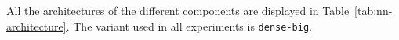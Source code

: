 \documentclass{article}
\begin{document}
All the architectures of the different components are displayed in Table~\ref{tab:nn-architecture}. The variant used in all experiments is \texttt{dense-big}.

\end{document}
